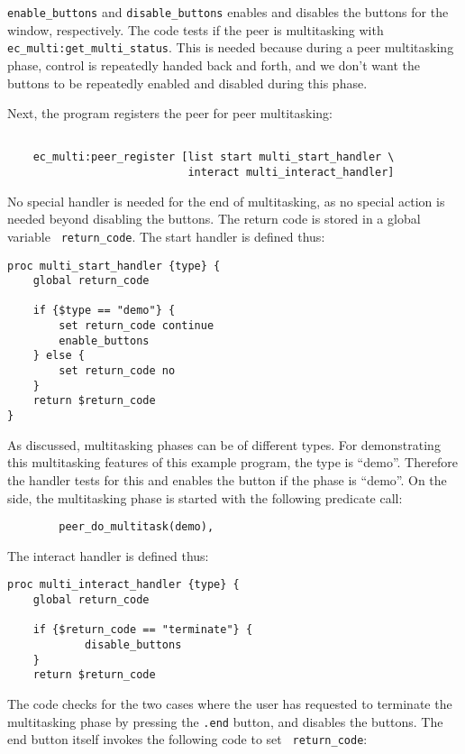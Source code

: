 {\tt enable_buttons} and {\tt disable_buttons} enables and disables the
buttons for the window, respectively. The code tests if the peer is
multitasking with {\tt ec_multi:get_multi_status}. This is needed because
during a peer multitasking phase, control is repeatedly handed back and
forth, and we don't want the buttons to be repeatedly enabled and disabled
during this phase.

Next, the program registers the peer for peer multitasking:

\begin{verbatim}

    ec_multi:peer_register [list start multi_start_handler \
                            interact multi_interact_handler]

\end{verbatim}

No special handler is
needed for the end of multitasking, as no special action is needed beyond
disabling the buttons. The return code is stored in a global variable {\tt
  return_code}. The start handler is defined thus:

\begin{verbatim}
proc multi_start_handler {type} {
    global return_code

    if {$type == "demo"} {
        set return_code continue
        enable_buttons
    } else {
        set return_code no
    }
    return $return_code
}
\end{verbatim}

As discussed, multitasking phases can be of different types. For
demonstrating this multitasking features of this example program, the type
is ``demo''. Therefore the handler tests for this and enables the button if
the phase is ``demo''. On the {\eclipse} side, the multitasking phase is
started with the following predicate call:

\begin{verbatim}
        peer_do_multitask(demo),
\end{verbatim}

The interact handler is defined thus:

\begin{verbatim}
proc multi_interact_handler {type} {
    global return_code

    if {$return_code == "terminate"} {
            disable_buttons
    }
    return $return_code
\end{verbatim}

The code checks for the two cases where the user has requested to terminate
the multitasking phase by pressing the {\tt .end} button, and disables the
buttons. The end button itself invokes the following code to set {\tt
  return_code}: 


